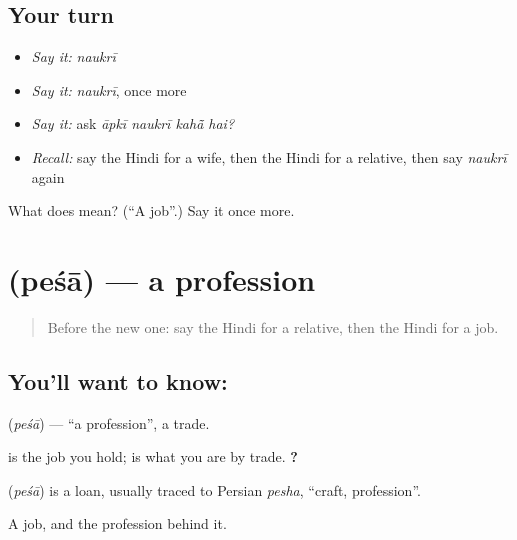 \subsection*{Your turn}
\begin{itemize}
\raggedright
  \item \emph{Say it:} \emph{naukrī}
  \item \emph{Say it:} \emph{naukrī}, once more
  \item \emph{Say it:} ask \emph{āpkī naukrī kahā̃ hai?}
  \item \emph{Recall:} say the Hindi for a wife, then the Hindi for a relative, then say \emph{naukrī} again
\end{itemize}

\begin{tcolorbox}[breakable,colback=teal!4,colframe=teal!35!black,title={Before you move on}]
What does  mean? (\textquotedblleft{}A job\textquotedblright{}.) Say it once more.
\end{tcolorbox}
\section[\texorpdfstring{\hi{पेशा} (peśā)}{पेशा (peśā)}]{ (peśā) — a profession}

\label{lesson:HI-C119-pesha}



\begin{quote}
Before the new one: say the Hindi for a relative, then the Hindi for a job.
\end{quote}

\subsection*{You'll want to know: }
\textbf{} (\emph{peśā}) — \textquotedblleft{}a profession\textquotedblright{}, a trade.

\textbf{} is the job you hold; \textbf{} is what you are by trade. \textbf{   ?}

\begin{cousinweb}
\textbf{} (\emph{peśā}) is a loan, usually traced to Persian \emph{pesha}, \textquotedblleft{}craft, profession\textquotedblright{}.
\end{cousinweb}

\begin{grammarlens}[title={What you've built}]
A job, and the profession behind it.
\end{grammarlens}

